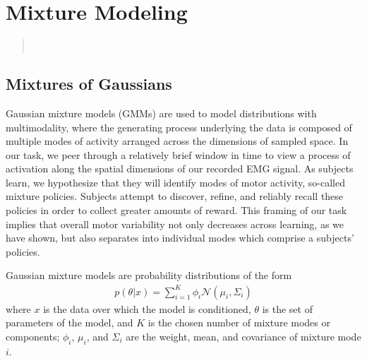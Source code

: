 \documentclass[../main.tex]{subfiles}
\begin{document}
\chapter{Mixture Modeling}\label{chap:gmms}

\bigskip
\begin{quote}
  \\
\end{quote}

\cleardoublepage%




\section{Mixtures of Gaussians}

Gaussian mixture models (GMMs) are used to model distributions with multimodality, where the generating process underlying the data is composed of multiple modes of activity arranged across the dimensions of sampled space. In our task, we peer through a relatively brief window in time to view a process of activation along the spatial dimensions of our recorded EMG signal. As subjects learn, we hypothesize that they will identify modes of motor activity, so-called mixture policies. Subjects attempt to discover, refine, and reliably recall these policies in order to collect greater amounts of reward. This framing of our task implies that overall motor variability not only decreases across learning, as we have shown, but also separates into individual modes which comprise a subjects' policies.

Gaussian mixture models are probability distributions of the form
%
\begin{align}
  {\displaystyle p({ {\theta }} | {x} )=\sum _{i=1}^{K}\phi _{i}{\mathcal {N}}({ {\mu _{i},\Sigma _{i}}})}
\end{align}
%
where ${x}$ is the data over which the model is conditioned, ${\theta}$ is the set of parameters of the model, and $K$ is the chosen number of mixture modes or components; $\phi_i$, ${\mu_i}$, and ${\Sigma_i}$ are the weight, mean, and covariance of mixture mode $i$.
\end{document}
